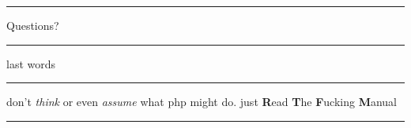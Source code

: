 \documentclass[final]{beamer}
\begin{document}
\begin{frame}
\begin{center}
\vspace{1em}
\hrule
\vspace{0.4em}
Questions?
\vspace{0.4em}
\hrule
\vspace{1em}
\end{center}
\end{frame}

\begin{frame}{last words}
\begin{center}
\vspace{1em}
\hrule
\vspace{0.4em}
don't \textit{think} or even \textit{assume} what php might do. \newline
just \alert<2>{\textbf{R}}ead \alert<2>{\textbf{T}}he \alert<2>{\textbf{F}}ucking \alert<2>{\textbf{M}}anual
\vspace{0.4em}
\hrule
\vspace{1em}
\end{center}
\end{frame}
\end{document}
